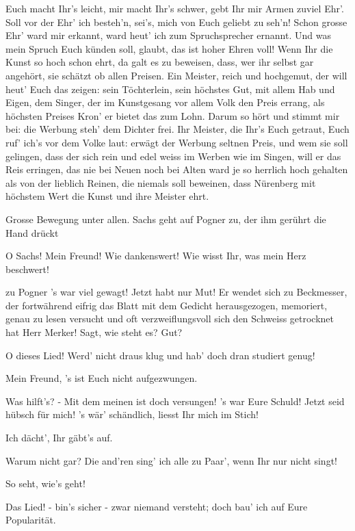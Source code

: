 \begin{drama}
\Sachsspeaks
Euch macht Ihr's leicht, mir macht Ihr's schwer,
gebt Ihr mir Armen zuviel Ehr'.
Soll vor der Ehr' ich besteh'n,
sei's, mich von Euch geliebt zu seh'n!
Schon grosse Ehr' ward mir erkannt,
ward heut' ich zum Spruchsprecher ernannt.
Und was mein Spruch Euch künden soll,
glaubt, das ist hoher Ehren voll!
Wenn Ihr die Kunst so hoch schon ehrt,
da galt es zu beweisen,
dass, wer ihr selbst gar angehört,
sie schätzt ob allen Preisen.
Ein Meister, reich und hochgemut,
der will heut' Euch das zeigen:
sein Töchterlein, sein höchstes Gut,
mit allem Hab und Eigen,
dem Singer, der im Kunstgesang
vor allem Volk den Preis errang,
als höchsten Preises Kron'
er bietet das zum Lohn.
Darum so hört und stimmt mir bei:
die Werbung steh' dem Dichter frei.
Ihr Meister, die Ihr's Euch getraut,
Euch ruf' ich's vor dem Volke laut:
erwägt der Werbung seltnen Preis,
und wem sie soll gelingen,
dass der sich rein und edel weiss
im Werben wie im Singen,
will er das Reis erringen,
das nie bei Neuen noch bei Alten
ward je so herrlich hoch gehalten
als von der lieblich Reinen,
die niemals soll beweinen,
dass Nürenberg mit höchstem Wert
die Kunst und ihre Meister ehrt.

Grosse Bewegung unter allen. Sachs geht auf Pogner zu, der ihm gerührt die Hand drückt

\Pognerspeaks
O Sachs! Mein Freund! Wie dankenswert!
Wie wisst Ihr, was mein Herz beschwert!

\Sachsspeaks
zu Pogner
's war viel gewagt! Jetzt habt nur Mut!
Er wendet sich zu Beckmesser, der fortwährend eifrig das Blatt mit dem Gedicht herausgezogen, memoriert, genau zu lesen versucht und oft verzweiflungsvoll sich den Schweiss getrocknet hat
Herr Merker! Sagt, wie steht es? Gut?

\Beckmesserspeaks
O dieses Lied! Werd' nicht draus klug
und hab' doch dran studiert genug!

\Sachsspeaks
Mein Freund, 's ist Euch nicht aufgezwungen.

\Beckmesserspeaks
Was hilft's? - Mit dem meinen ist doch versungen!
's war Eure Schuld! Jetzt seid hübsch für mich!
's wär' schändlich, liesst Ihr mich im Stich!

\Sachsspeaks
Ich dächt', Ihr gäbt's auf.

\Beckmesserspeaks
Warum nicht gar?
Die and'ren sing' ich alle zu Paar', wenn Ihr nur nicht singt!

\Sachsspeaks
So seht, wie's geht!

\Beckmesserspeaks
Das Lied! - bin's sicher - zwar niemand versteht;
doch bau' ich auf Eure Popularität.


\end{drama}
